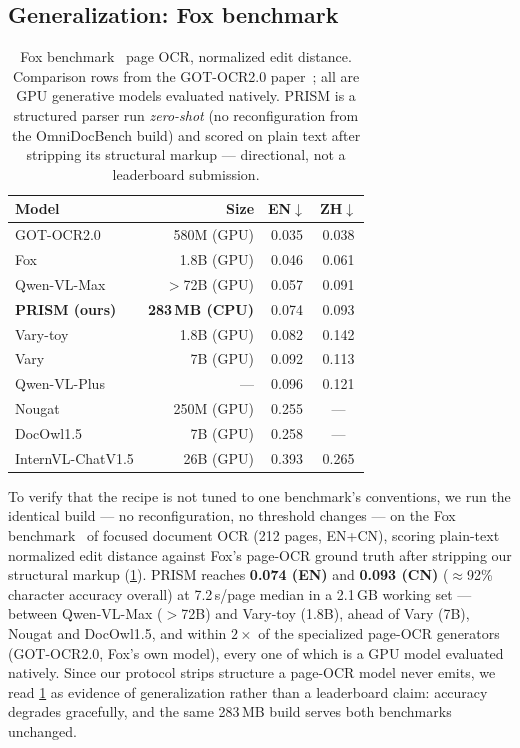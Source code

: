 \subsection{Generalization: Fox benchmark}
\label{sec:fox}

\begin{table}[t]
\centering
\caption{Fox benchmark~\cite{fox} page OCR, normalized edit distance. Comparison rows from the GOT-OCR2.0 paper~\cite{got}; all are GPU generative models evaluated natively. PRISM is a structured parser run \emph{zero-shot} (no reconfiguration from the OmniDocBench build) and scored on plain text after stripping its structural markup --- directional, not a leaderboard submission.}
\label{tab:fox}
\small
\setlength{\tabcolsep}{5pt}
\begin{tabular}{lrcc}
\toprule
Model & Size & EN$\downarrow$ & ZH$\downarrow$ \\
\midrule
GOT-OCR2.0 & 580M (GPU) & 0.035 & 0.038 \\
Fox & 1.8B (GPU) & 0.046 & 0.061 \\
Qwen-VL-Max & $>$72B (GPU) & 0.057 & 0.091 \\
\textbf{PRISM (ours)} & \textbf{283\,MB (CPU)} & 0.074 & 0.093 \\
Vary-toy & 1.8B (GPU) & 0.082 & 0.142 \\
Vary & 7B (GPU) & 0.092 & 0.113 \\
Qwen-VL-Plus & --- & 0.096 & 0.121 \\
Nougat & 250M (GPU) & 0.255 & --- \\
DocOwl1.5 & 7B (GPU) & 0.258 & --- \\
InternVL-ChatV1.5 & 26B (GPU) & 0.393 & 0.265 \\
\bottomrule
\end{tabular}
\end{table}

To verify that the recipe is not tuned to one benchmark's conventions, we run the identical build --- no reconfiguration, no threshold changes --- on the Fox benchmark~\cite{fox} of focused document OCR (212 pages, EN+CN), scoring plain-text normalized edit distance against Fox's page-OCR ground truth after stripping our structural markup (\cref{tab:fox}). PRISM reaches \textbf{0.074 (EN)} and \textbf{0.093 (CN)} ($\approx$92\% character accuracy overall) at 7.2\,s/page median in a 2.1\,GB working set --- between Qwen-VL-Max ($>$72B) and Vary-toy (1.8B), ahead of Vary (7B), Nougat and DocOwl1.5, and within $2\times$ of the specialized page-OCR generators (GOT-OCR2.0, Fox's own model), every one of which is a GPU model evaluated natively. Since our protocol strips structure a page-OCR model never emits, we read \cref{tab:fox} as evidence of generalization rather than a leaderboard claim: accuracy degrades gracefully, and the same 283\,MB build serves both benchmarks unchanged.

